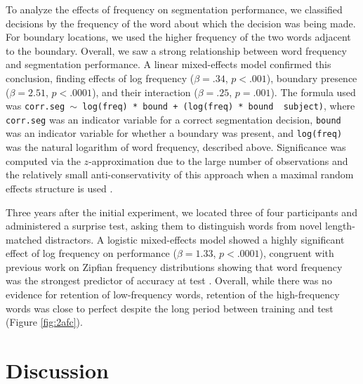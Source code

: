 \documentclass[10pt]{article}
\begin{document}
To analyze the effects of frequency on segmentation performance, we classified decisions by the frequency of the word about which the decision was being made. For boundary locations, we used the higher frequency of the two words adjacent to the boundary. Overall, we saw a strong relationship between word frequency and segmentation performance. A linear mixed-effects model \cite{gelman2006} confirmed this conclusion, finding effects of log frequency ($\beta = .34$, $p < .001$), boundary presence ($\beta = 2.51$, $p < .0001$), and their interaction ($\beta = .25$, $p = .001$). The formula used was \texttt{corr.seg $\sim$ log(freq) * bound + (log(freq) * bound~\textbar~subject)}, where \texttt{corr.seg} was an indicator variable for a correct segmentation decision, \texttt{bound} was an indicator variable for whether a boundary was present, and \texttt{log(freq)} was the natural logarithm of word frequency, described above. Significance was computed via the $z$-approximation due to the large number of observations and the relatively small anti-conservativity of this approach when a maximal random effects structure is used \cite{barrinpress}.




Three years after the initial experiment, we located three of four participants and administered a surprise test, asking them to distinguish words from novel length-matched distractors. A logistic mixed-effects model showed a highly significant effect of log frequency on performance ($\beta = 1.33$, $p < .0001$), congruent with previous work on Zipfian frequency distributions showing that word frequency was the strongest predictor of accuracy at test \cite{kurumada2011}. Overall, while there was no evidence for retention of low-frequency words, retention of the high-frequency words was close to perfect despite the long period between training and test (Figure \ref{fig:2afc}).


\section*{Discussion}
\end{document}

